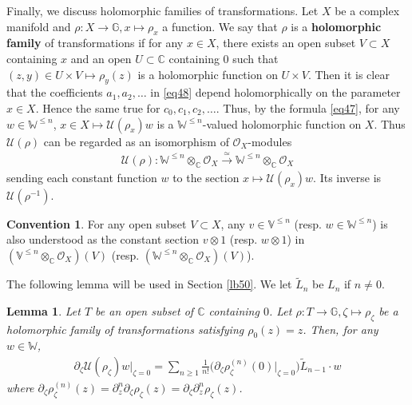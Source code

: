\documentclass[12pt,a4paper,notitlepage]{report}
\theoremstyle{definition}
\newtheorem{cv}[df]{Convention}
\theoremstyle{plain}
\newtheorem{lm}[df]{Lemma}
\newcommand{\mc}{\mathcal}
\newcommand{\wtd}{\widetilde}
\newcommand{\scr}{\mathscr}
\newcommand{\mbb}{\mathbb}
\newcommand{\blt}{\bullet}
\newcommand{\Vbb}{\mathbb V}
\newcommand{\Wbb}{\mathbb W}
\newcommand{\Gbb}{\mathbb G}
\newcommand{\Cbb}{\mathbb C}
\numberwithin{equation}{section}
\begin{document}
Finally, we discuss holomorphic families of transformations. Let $X$ be a complex manifold and $\rho:X\rightarrow\mbb G,x\mapsto \rho_x$ a function. We say that $\rho$ is a \textbf{holomorphic family} of transformations if for any $x\in X$, there exists an open subset $V\subset X$ containing $x$ and an open $U\subset\Cbb$ containing $0$ such that  $(z,y)\in U\times V\mapsto \rho_y(z)$ is a holomorphic function on $U\times V$. Then it is clear that the coefficients $a_1,a_2,\dots$ in \eqref{eq48} depend holomorphically on the parameter $x\in X$. Hence the same true for $c_0,c_1,c_2,\dots$. Thus, by the formula \eqref{eq47}, for any $w\in\Wbb^{\leq n}$, $x\in X\mapsto \mc U(\rho_x)w$ is a $\Wbb^{\leq n}$-valued holomorphic function on $X$. Thus $\mc U(\rho)$ can be regarded as an isomorphism of  $\scr O_X$-modules 
\begin{align}
\mc U(\rho): \Wbb^{\leq n}\otimes_{\Cbb}\scr O_X\xrightarrow{\simeq}\Wbb^{\leq n}\otimes_{\Cbb}\scr O_X\label{eq64}
\end{align}
sending each constant function $w$ to the section $x\mapsto \mc U(\rho_x)w$. \index{U@$\mc U(\rho),\mc U(\eta_\blt)$} Its inverse is  $\mc U(\rho^{-1})$.



\begin{cv}
For any open subset $V\subset X$, any $v\in\Vbb^{\leq n}$  (resp. $w\in\Wbb^{\leq n}$) is also understood as the constant section $v\otimes 1$ (resp. $w\otimes 1$) in $(\Vbb^{\leq n}\otimes_{\Cbb}\scr O_X)(V)$ (resp. $(\Wbb^{\leq n}\otimes_{\Cbb}\scr O_X)(V)$).
\end{cv}




The following lemma will be used in Section \ref{lb50}. We let $\wtd L_n$ be $L_n$ if $n\neq 0$. \index{L0Ln@$\wtd L_0,\wtd L_n$}

\begin{lm}\label{lb29}
Let $T$ be an open subset of $\Cbb$ containing $0$. Let $\rho:T\rightarrow\Gbb,\zeta\mapsto\rho_\zeta$ be a holomorphic family of transformations satisfying $\rho_0(z)=z$. Then, for any $w\in\Wbb$, 
\begin{align}
\partial_\zeta\mc U(\rho_\zeta)w\Big|_{\zeta=0}=\sum_{n\geq 1}\frac 1{n!}\Big(\partial_\zeta\rho_\zeta^{(n)}(0)\Big|_{\zeta=0}\Big)\wtd L_{n-1}\cdot w\label{eq82}
\end{align}
where $\partial_\zeta\rho_\zeta^{(n)}(z)=\partial_z^n\partial_\zeta\rho_\zeta(z)=\partial_\zeta\partial_z^n\rho_\zeta(z)$.
\end{lm}
\end{document}
